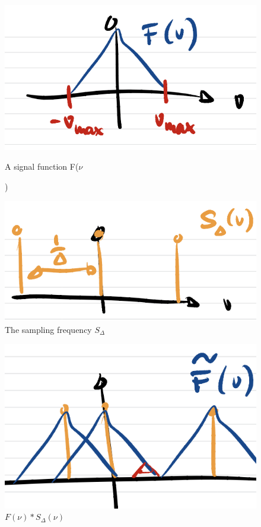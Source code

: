 \documentclass[11pt]{article}
\begin{document}
    \begin{figure}
        \begin{minipage}[t]{.49\textwidth}    
        \centering
        \includegraphics[width=\textwidth]{figures/lecture03/Fnu.png}
        \caption{A signal function F($\nu$})
        \label{fig:Signal Function f(nu)}
        \end{minipage}\hfill
        \begin{minipage}[t]{.49\textwidth}    
        \centering
        \includegraphics[width=\textwidth]{figures/lecture03/Sd.png}
        \caption{The sampling frequency $S_{\Delta}$}
        \label{fig:sampling frequency S_delta}
        \end{minipage}
    \end{figure}

    \begin{figure}
        \centering
        \includegraphics{figures/lecture03/FSd.png}
        \caption{$F(\nu)*S_\Delta(\nu)$}
        \label{fig:Convolution of F and S_delta}
    \end{figure}
\end{document}

